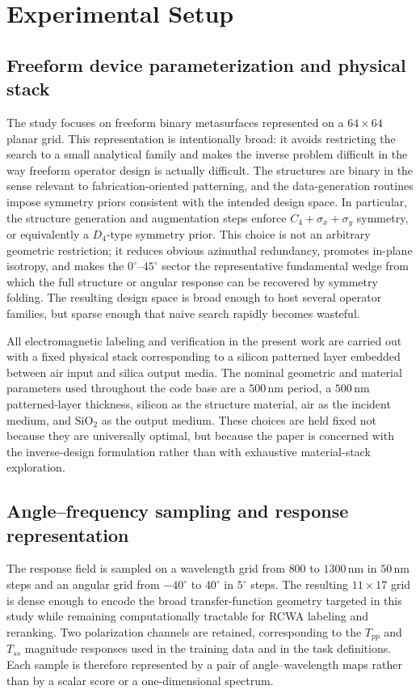 \section{Experimental Setup}

\subsection{Freeform device parameterization and physical stack}

The study focuses on freeform binary metasurfaces represented on a $64\times64$ planar grid. This representation is intentionally broad: it avoids restricting the search to a small analytical family and makes the inverse problem difficult in the way freeform operator design is actually difficult. The structures are binary in the sense relevant to fabrication-oriented patterning, and the data-generation routines impose symmetry priors consistent with the intended design space. In particular, the structure generation and augmentation steps enforce $C_4+\sigma_x+\sigma_y$ symmetry, or equivalently a $D_4$-type symmetry prior. This choice is not an arbitrary geometric restriction; it reduces obvious azimuthal redundancy, promotes in-plane isotropy, and makes the $0^{\circ}$--$45^{\circ}$ sector the representative fundamental wedge from which the full structure or angular response can be recovered by symmetry folding. The resulting design space is broad enough to host several operator families, but sparse enough that naive search rapidly becomes wasteful.

All electromagnetic labeling and verification in the present work are carried out with a fixed physical stack corresponding to a silicon patterned layer embedded between air input and silica output media. The nominal geometric and material parameters used throughout the code base are a $500\,\mathrm{nm}$ period, a $500\,\mathrm{nm}$ patterned-layer thickness, silicon as the structure material, air as the incident medium, and $\mathrm{SiO}_2$ as the output medium. These choices are held fixed not because they are universally optimal, but because the paper is concerned with the inverse-design formulation rather than with exhaustive material-stack exploration.

\subsection{Angle--frequency sampling and response representation}

The response field is sampled on a wavelength grid from $800$ to $1300\,\mathrm{nm}$ in $50\,\mathrm{nm}$ steps and an angular grid from $-40^{\circ}$ to $40^{\circ}$ in $5^{\circ}$ steps. The resulting $11\times17$ grid is dense enough to encode the broad transfer-function geometry targeted in this study while remaining computationally tractable for RCWA labeling and reranking. Two polarization channels are retained, corresponding to the $T_{pp}$ and $T_{ss}$ magnitude responses used in the training data and in the task definitions. Each sample is therefore represented by a pair of angle--wavelength maps rather than by a scalar score or a one-dimensional spectrum.

